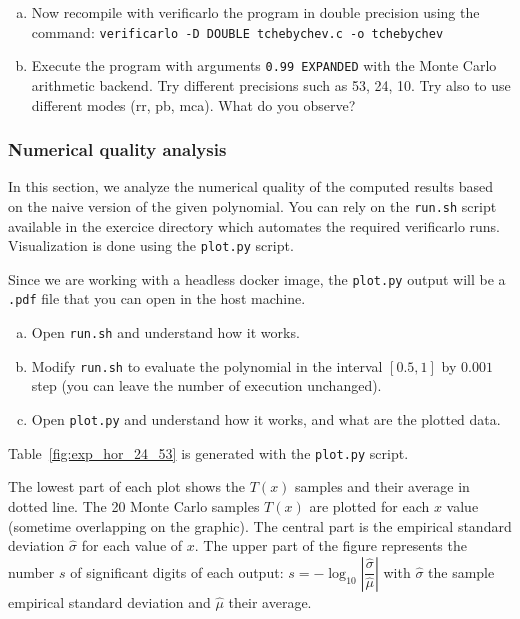 \begin{question}
  \begin{enumerate}[(a)]
  \item Now recompile with verificarlo the program in double precision using the command:\newline
    {\tt verificarlo -D DOUBLE tchebychev.c -o tchebychev} \\
  \item Execute the program with arguments \texttt{0.99 EXPANDED} with the Monte Carlo arithmetic backend. Try different precisions such as 53, 24, 10. Try also to use different modes (rr, pb, mca). What do you observe?
  \end{enumerate}
\end{question}

\subsubsection{Numerical quality analysis}

In this section, we analyze the numerical quality of the computed results based on the naive version of the given polynomial. 
You can rely on the \texttt{run.sh} script available in the exercice directory which automates the required verificarlo runs. 
Visualization is done using the \texttt{plot.py} script.

Since we are working with a headless docker image, the \texttt{plot.py} output
will be a \texttt{.pdf} file that you can open in the host machine.


\begin{question}
  \begin{enumerate}[(a)]
 \item Open {\tt run.sh} and understand how it works.
  \item Modify {\tt run.sh} to evaluate the polynomial in the interval $[0.5,1]$ by $0.001$ step (you can leave the number of execution unchanged).
  \item Open {\tt plot.py} and understand how it works, and what are the plotted data.
  \end{enumerate}
\end{question}

Table~\ref{fig:exp_hor_24_53} is generated with the \texttt{plot.py} script.

The lowest part of each plot shows the $T(x)$ samples and their average in dotted line. The 20 Monte Carlo samples $T(x)$ are plotted for each $x$ value (sometime overlapping on the graphic).
The central part is the empirical standard deviation $\hat\sigma$ for each value of $x$.
The upper part of the figure represents the number $s$ of significant digits of each output: $s=-\log_{10}\left|\dfrac{\hat\sigma}{\hat\mu}\right|$ with $\hat\sigma$ the sample empirical standard deviation and $\hat\mu$ their average.

